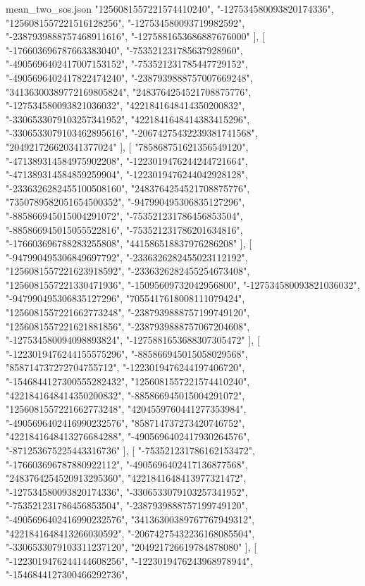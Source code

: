\begin{filecontents*}[overwrite]{mean_two_sos.json}
    "1256081557221574410240",
    "-127534580093820174336",
    "1256081557221516128256",
    "-127534580093719982592",
    "-2387939888757468911616",
    "-1275881653686887676000"
   ],
   [
    "-176603696787663383040",
    "-753521231785637928960",
    "-4905696402417007153152",
    "-753521231785447729152",
    "-4905696402417822474240",
    "-2387939888757007669248",
    "34136300389772169805824",
    "2483764254521708875776",
    "-127534580093821036032",
    "4221841648414350200832",
    "-3306533079103257341952",
    "4221841648414383415296",
    "-3306533079103462895616",
    "-20674275432239381741568",
    "204921726620341377024"
   ],
   [
    "785868751621356549120",
    "-471389314584975902208",
    "-1223019476244244721664",
    "-471389314584859259904",
    "-1223019476244042928128",
    "-2336326282455100508160",
    "2483764254521708875776",
    "7350789582051654500352",
    "-947990495306835127296",
    "-885866945015004291072",
    "-753521231786456853504",
    "-885866945015055522816",
    "-753521231786201634816",
    "-176603696788283255808",
    "441586518837976286208"
   ],
   [
    "-947990495306849697792",
    "-2336326282455023112192",
    "1256081557221623918592",
    "-2336326282455254673408",
    "1256081557221330471936",
    "-15095609732042956800",
    "-127534580093821036032",
    "-947990495306835127296",
    "7055417618008111079424",
    "1256081557221662773248",
    "-2387939888757199749120",
    "1256081557221621881856",
    "-2387939888757067204608",
    "-127534580094098893824",
    "-1275881653688307305472"
   ],
   [
    "-1223019476244155575296",
    "-885866945015058029568",
    "858714737272704755712",
    "-1223019476244197406720",
    "-1546844127300555282432",
    "1256081557221574410240",
    "4221841648414350200832",
    "-885866945015004291072",
    "1256081557221662773248",
    "4204559760441277353984",
    "-4905696402416990232576",
    "858714737273420746752",
    "4221841648413276684288",
    "-4905696402417930264576",
    "-871253675225443316736"
   ],
   [
    "-753521231786162153472",
    "-176603696787880922112",
    "-4905696402417136877568",
    "2483764254520913295360",
    "4221841648413977321472",
    "-127534580093820174336",
    "-3306533079103257341952",
    "-753521231786456853504",
    "-2387939888757199749120",
    "-4905696402416990232576",
    "34136300389767767949312",
    "4221841648413266030592",
    "-20674275432236168085504",
    "-3306533079103311237120",
    "204921726619784878080"
   ],
   [
    "-1223019476244144608256",
    "-1223019476243968978944",
    "-1546844127300466292736",

\end{filecontents*}

